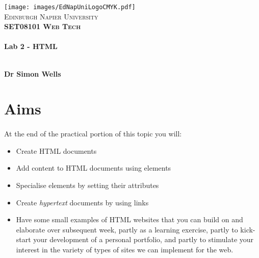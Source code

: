 \documentclass[10pt, a4paper]{article}
\begin{document}

\begin{titlepage}
\vspace*{5cm}
\begin{center}
\texttt{[image: images/EdNapUniLogoCMYK.pdf]}~\\[1cm]

\textsc{\Large Edinburgh Napier University}\\[1.5cm]

\textsc{\LARGE \bfseries SET08101 Web Tech}\\[0.5cm]

\hrulefill \\[0.4cm]
{\huge \bfseries Lab 2 - HTML \\[0.4cm] }
\hrulefill \\[1.5cm]

\begin{minipage}{0.4\textwidth}
\begin{flushleft} \large
\textbf{Dr Simon Wells} \\
\end{flushleft}
\end{minipage}

\vfill

\end{center}
\end{titlepage}




%

\section{Aims}
\paragraph{} At the end of the practical portion of this topic you will:

\begin{itemize}
\item Create HTML documents
\item Add content to HTML documents using elements
\item Specialise elements by setting their attributes
\item Create \emph{hypertext} documents by using links
\item Have some small examples of HTML websites that you can build on and elaborate over subsequent week, partly as a learning exercise, partly to kick-start your development of a personal portfolio, and partly to stimulate your interest in the variety of types of sites we can implement for the web.
\end{itemize}
\end{document}
